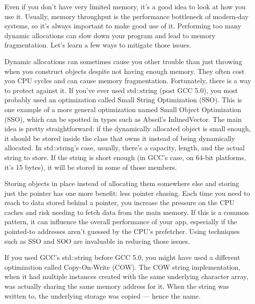 

Even if you don't have very limited memory, it's a good idea to look at how you use it. Usually, memory throughput is the performance bottleneck of modern-day systems, so it's always important to make good use of it. Performing too many dynamic allocations can slow down your program and lead to memory fragmentation. Let's learn a few ways to mitigate those issues.


Dynamic allocations can sometimes cause you other trouble than just throwing when you construct objects despite not having enough memory. They often cost you CPU cycles and can cause memory fragmentation. Fortunately, there is a way to protect against it. If you've ever used std::string (post GCC 5.0), you most probably used an optimization called Small String Optimization (SSO). This is one example of a more general optimization named Small Object Optimization (SSO), which can be spotted in types such as Abseil's InlinedVector. The main idea is pretty straightforward: if the dynamically allocated object is small enough, it should be stored inside the class that owns it instead of being dynamically allocated. In std::string's case, usually, there's a capacity, length, and the actual string to store. If the string is short enough (in GCC's case, on 64-bit platforms, it's 15 bytes), it will be stored in some of those members.

Storing objects in place instead of allocating them somewhere else and storing just the pointer has one more benefit: less pointer chasing. Each time you need to reach to data stored behind a pointer, you increase the pressure on the CPU caches and risk needing to fetch data from the main memory. If this is a common pattern, it can influence the overall performance of your app, especially if the pointed-to addresses aren't guessed by the CPU's prefetcher. Using techniques such as SSO and SOO are invaluable in reducing those issues.


If you used GCC's std::string before GCC 5.0, you might have used a different optimization called Copy-On-Write (COW). The COW string implementation, when it had multiple instances created with the same underlying character array, was actually sharing the same memory address for it. When the string was written to, the underlying storage was copied — hence the name.

